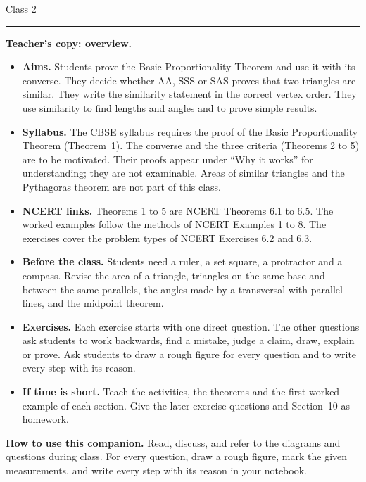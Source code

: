 \hfill{\large Class 2}\par\vspace{3pt}
\noindent\rule{\linewidth}{0.6pt}\par\medskip

\ifteacher
\colorbox{panel}{%
  \parbox{\dimexpr\linewidth-2\fboxsep\relax}{%
    \small\textbf{Teacher's copy: overview.}
    \begin{itemize}[leftmargin=1.6em,itemsep=1pt,topsep=2pt]
      \item \textbf{Aims.} Students prove the Basic Proportionality Theorem and use it with its converse. They decide whether AA, SSS or SAS proves that two triangles are similar. They write the similarity statement in the correct vertex order. They use similarity to find lengths and angles and to prove simple results.
      \item \textbf{Syllabus.} The CBSE syllabus requires the proof of the Basic Proportionality Theorem (Theorem~1). The converse and the three criteria (Theorems 2 to 5) are to be motivated. Their proofs appear under ``Why it works'' for understanding; they are not examinable. Areas of similar triangles and the Pythagoras theorem are not part of this class.
      \item \textbf{NCERT links.} Theorems 1 to 5 are NCERT Theorems 6.1 to 6.5. The worked examples follow the methods of NCERT Examples 1 to 8. The exercises cover the problem types of NCERT Exercises 6.2 and 6.3.
      \item \textbf{Before the class.} Students need a ruler, a set square, a protractor and a compass. Revise the area of a triangle, triangles on the same base and between the same parallels, the angles made by a transversal with parallel lines, and the midpoint theorem.
      \item \textbf{Exercises.} Each exercise starts with one direct question. The other questions ask students to work backwards, find a mistake, judge a claim, draw, explain or prove. Ask students to draw a rough figure for every question and to write every step with its reason.
      \item \textbf{If time is short.} Teach the activities, the theorems and the first worked example of each section. Give the later exercise questions and Section~10 as homework.
    \end{itemize}}}
\else
\colorbox{panel}{%
  \parbox{\dimexpr\linewidth-2\fboxsep\relax}{%
    \textbf{\color{accent}How to use this companion.}
    Read, discuss, and refer to the diagrams and questions during class. For every question, draw a rough figure, mark the given measurements, and write every step with its reason in your notebook.}}
\fi

